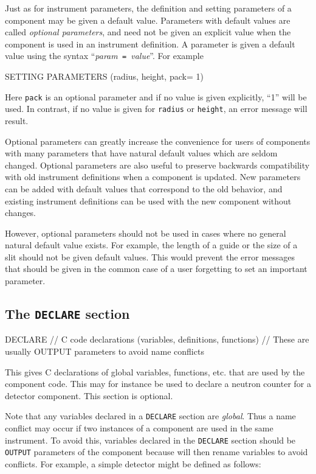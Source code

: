 Just as for instrument parameters, the definition and setting parameters of a
component may be given a default value. Parameters with default values are
called \emph{optional parameters}, and need not be given an explicit value when
the component is used in an instrument definition. A parameter is given a
default value using the syntax ``\textit{param}\texttt{ = }\textit{value}''.
For example
\begin{mcstas}
SETTING PARAMETERS (radius, height, pack= 1)
\end{mcstas}
Here \verb+pack+ is an optional parameter and if no value is given
explicitly, ``1'' will be used. In contrast, if no value is
  given for \texttt{radius} or \texttt{height}, an error message will
  result.

  Optional parameters can greatly increase the convenience for users of
  components with many parameters that have natural default values which are
  seldom changed. Optional parameters are also useful to preserve backwards
  compatibility with old instrument definitions when a component is updated. New
  parameters can be added with default values that correspond to the old
  behavior, and existing instrument definitions can be used with the new
  component without changes.

  However, optional parameters should not be used in cases where no general
  natural default value exists. For example, the length of a guide or the size
  of a slit should not be given default values. This would prevent the error
  messages that should be given in the common case of a user forgetting to set
  an important parameter.


\subsection{The \texttt{DECLARE} section}
\label{s:comp-declare}
\begin{mcstas}
DECLARE
// C code declarations (variables, definitions, functions)
// These are usually OUTPUT parameters to avoid name conflicts 
\end{mcstas}
 This gives C declarations of global variables,
functions, etc. that are used by the component code. This may for instance be
used to declare a neutron counter for a detector component. This section is
optional.

Note that any variables declared in a \verb+DECLARE+ section are
\emph{global}. Thus a name conflict may occur if two instances of a component
are used in the same instrument. To avoid this, variables declared in the
\texttt{DECLARE} section should be \texttt{OUTPUT} parameters of the component
because \MCS will then rename variables to avoid conflicts.  For example, a
simple detector might be defined as follows:

